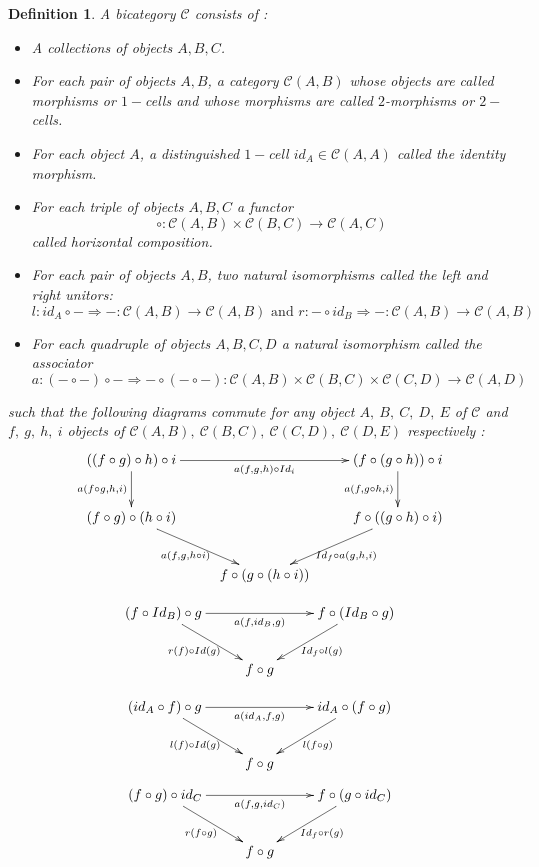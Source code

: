 \documentclass[a4paper, 12pt, twoside,openright]{report}
\newtheorem{definition}{Definition}
\begin{document}
\begin{definition}\label{definition/bicategory}
A bicategory $\mathcal{C}$ consists of :
\begin{itemize}
\item A collections of objects $A,B,C$.
\item For each pair of objects $A,B$, a category $\mathcal{C}(A,B)$ whose objects are called morphisms or $1-$cells and whose morphisms are called $2$-morphisms or $2-$cells.
\item For each object $A$, a distinguished $1-$cell $id_A\in \mathcal{C}(A,A)$ called the identity morphism.
\item For each triple of objects $A,B,C$ a functor $$\circ : \mathcal{C}(A,B) \times \mathcal{C}(B,C) \rightarrow \mathcal{C}(A,C)$$ called horizontal composition.
\item For each pair of objects $A,B$, two natural isomorphisms called the left and right unitors: $$l:  id_A \circ - \Rightarrow - :\mathcal{C}(A,B)\rightarrow \mathcal{C}(A,B) \text{ and } r:    - \circ id_B \Rightarrow - :\mathcal{C}(A,B)\rightarrow \mathcal{C}(A,B) $$
\item For each quadruple of objects $A,B,C,D$ a natural isomorphism called the associator $$a: (- \circ -) \circ - \Rightarrow - \circ ( - \circ -): \mathcal{C}(A,B) \times \mathcal{C}(B,C) \times \mathcal{C}(C,D)  \rightarrow \mathcal{C}(A,D)$$
\end{itemize}
such that the following diagrams commute for any object $A,~B,~C,~D,~E$ of $\mathcal{C}$ and $f,~g,~h,~i$ objects of $\mathcal{C}(A,B),~\mathcal{C}(B,C),~\mathcal{C}(C,D),~\mathcal{C}(D,E)$ respectively :
$$\xymatrix @-1.2pc {
((f \circ g) \circ h) \circ i
\ar[rrrr]_-{a(f,g,h) \circ Id_i}
\ar[dd]_-{a(f\circ g, h,i)}
&&&&
(f \circ (g \circ h)) \circ i
\ar[dd]_-{a(f, g \circ h, i)}
\\
\\
(f \circ g) \circ (h \circ i)
\ar[ddrr]_-{a(f,g,h \circ i)}
&&&&
f \circ ((g \circ h) \circ i)
\ar[ddll]^-{ Id_f \circ a(g,h,i)}
\\
\\
&&
f \circ(g \circ (h \circ i))
}
$$




$$
\xymatrix @-1.2pc {
(f \circ Id_B) \circ g
\ar[rrrr]_-{a(f, id_B, g)}
\ar[ddrr]_-{r(f) \circ Id(g) }
&&&&
f \circ (Id_B \circ g)
\ar[ddll]^-{Id_f \circ l(g) }
\\
\\
&&
f \circ g
}
$$

$$
\xymatrix @-1.2pc {
(id_A \circ f) \circ g
\ar[rrrr]_-{a(id_A, f, g)}
\ar[ddrr]_-{l(f) \circ Id(g) }
&&&&
id_A \circ (f \circ g)
\ar[ddll]^-{l( f\circ g) }
\\
\\
&&
f \circ g
}
$$
$$
\xymatrix @-1.2pc {
(f \circ g) \circ id_C
\ar[rrrr]_-{a(f, g, id_C)}
\ar[ddrr]_-{r(f \circ g) }
&&&&
f \circ (g \circ id_C)
\ar[ddll]^-{Id_f \circ r(g) }
\\
\\
&&
f \circ g
}
$$

\end{definition}
\end{document}
